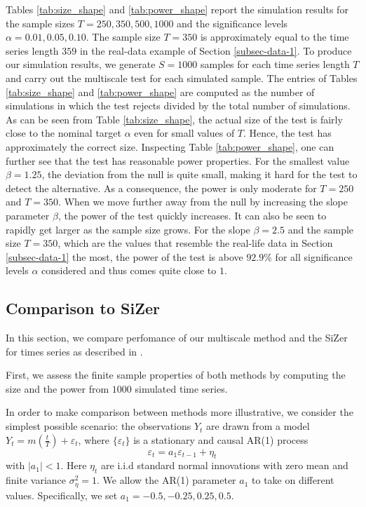 \documentclass[a4paper,12pt]{article}
\begin{document}
Tables \ref{tab:size_shape} and \ref{tab:power_shape} report the simulation results for the sample sizes $T=250,350,500, 1000$ and the significance levels $\alpha = 0.01, 0.05, 0.10$. The sample size $T = 350$ is approximately equal to the time series length $359$ in the real-data example of Section \ref{subsec-data-1}. To produce our simulation results, we generate $S=1000$ samples for each time series length $T$ and carry out the multiscale test for each simulated sample. The entries of Tables \ref{tab:size_shape} and \ref{tab:power_shape} are computed as the number of simulations in which the test rejects divided by the total number of simulations. As can be seen from Table \ref{tab:size_shape}, the actual size of the test is fairly close to the nominal target $\alpha$ even for small values of $T$. Hence, the test has approximately the correct size. Inspecting Table \ref{tab:power_shape}, one can further see that the test has reasonable power properties. For the smallest value $\beta = 1.25$, the deviation from the null is quite small, making it hard for the test to detect the alternative. As a consequence, the power is only moderate for $T=250$ and $T=350$. When we move further away from the null by increasing the slope parameter $\beta$, the power of the test quickly increases. It can also be seen to rapidly get larger as the sample size grows. For the slope $\beta =2.5$ and the sample size $T=350$, which are the values that resemble the real-life data in Section \ref{subsec-data-1} the most, the power of the test is above $92.9\%$ for all significance levels $\alpha$ considered and thus comes quite close to $1$. 

\subsection{Comparison to SiZer}\label{subsec-sim-2}

In this section, we compare perfomance of our multiscale method and the SiZer for times series as described in \cite{Rondonotti2007}. 

First, we assess the finite sample properties of both methods by computing the size and the power from $1000$ simulated time series.

In order to make comparison between methods more illustrative, we consider the simplest possible scenario: the observations $Y_t$ are drawn from a model $Y_t = m(\frac{t}{T}) + \varepsilon_t$, where $\{\varepsilon_t\}$ is a stationary and causal AR(1) process
\[ \varepsilon_t = a_1 \varepsilon_{t - 1} + \eta_t
\]
with $|a_1| < 1$. Here $\eta_t$ are i.i.d standard normal innovations with zero mean and finite variance $\sigma_\eta^2 = 1$. We allow the AR(1) parameter $a_1$ to take on different values. Specifically, we set $a_1 = -0.5, -0.25, 0.25, 0.5$.
\end{document}
